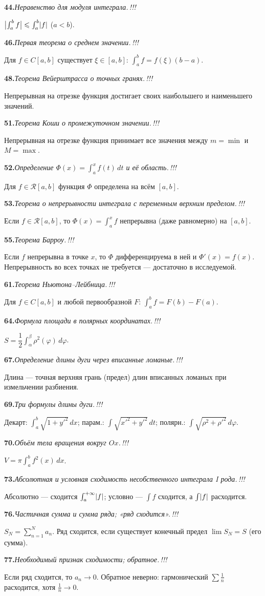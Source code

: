 \documentclass[10pt,a4paper]{article}
\newcommand{\dx}{\,dx}
\newcommand{\dt}{\,dt}
\renewcommand{\le}{\leqslant}
\DeclarePairedDelimiter{\abs}{\lvert}{\rvert}
\theoremstyle{definition}
\theoremstyle{plain}
\newcommand{\writespace}{\vspace{7.5mm}}
\newcommand{\tm}{\textcolor{teormin}{\,!!!}}
\newcommand{\faq}[3]{%
  \par\smallskip\noindent
  \textbf{#1.}\enspace\textit{#2}\par
  \nobreak\vspace{0.3ex}\noindent #3\par
  \writespace}
\begin{document}
\faq{44}{Неравенство для модуля интеграла.\tm}{%
$\abs[\big]{\int_a^b f}\le\int_a^b\abs{f}$ ($a<b$).}

\faq{46}{Первая теорема о среднем значении.\tm}{%
Для $f\in C[a,b]$ существует $\xi\in[a,b]$: $\int_a^b f=f(\xi)(b-a)$.}

\faq{48}{Теорема Вейерштрасса о точных гранях.\tm}{%
Непрерывная на отрезке функция достигает своих наибольшего и наименьшего значений.}

\faq{51}{Теорема Коши о промежуточном значении.\tm}{%
Непрерывная на отрезке функция принимает все значения между $m=\min$ и $M=\max$.}

\faq{52}{Определение $\Phi(x)=\int_a^x f(t)\dt$ и её область.\tm}{%
Для $f\in\mathcal R[a,b]$ функция $\Phi$ определена на всём $[a,b]$.}

\faq{53}{Теорема о непрерывности интеграла с переменным верхним пределом.\tm}{%
Если $f\in\mathcal R[a,b]$, то $\Phi(x)=\int_a^x f$ непрерывна (даже равномерно) на $[a,b]$.}

\faq{55}{Теорема Барроу.\tm}{%
Если $f$ непрерывна в точке $x$, то $\Phi$ дифференцируема в ней и $\Phi'(x)=f(x)$. Непрерывность
во всех точках не требуется — достаточно в исследуемой.}

\faq{61}{Теорема Ньютона–Лейбница.\tm}{%
Для $f\in C[a,b]$ и любой первообразной $F$: $\int_a^b f=F(b)-F(a)$.}

\faq{64}{Формула площади в полярных координатах.\tm}{%
$S=\dfrac12\int_\alpha^\beta\rho^2(\varphi)\,d\varphi$.}

\faq{67}{Определение длины дуги через вписанные ломаные.\tm}{%
Длина — точная верхняя грань (предел) длин вписанных ломаных при измельчении разбиения.}

\faq{69}{Три формулы длины дуги.\tm}{%
Декарт: $\int_a^b\sqrt{1+y'^2}\dx$; парам.: $\int\sqrt{x'^2+y'^2}\dt$; полярн.:
$\int\sqrt{\rho^2+\rho'^2}\,d\varphi$.}

\faq{70}{Объём тела вращения вокруг $Ox$.\tm}{%
$V=\pi\int_a^b f^2(x)\dx$.}

\faq{73}{Абсолютная и условная сходимость несобственного интеграла I рода.\tm}{%
Абсолютно — сходится $\int_a^{+\infty}\abs{f}$; условно — $\int f$ сходится, а $\int\abs{f}$
расходится.}

\faq{76}{Частичная сумма и сумма ряда; «ряд сходится».\tm}{%
$S_N=\sum_{n=1}^N a_n$. Ряд сходится, если существует конечный предел $\lim S_N=S$ (его сумма).}

\faq{77}{Необходимый признак сходимости; обратное.\tm}{%
Если ряд сходится, то $a_n\to0$. Обратное неверно: гармонический $\sum\frac1n$ расходится, хотя
$\frac1n\to0$.}
\end{document}
